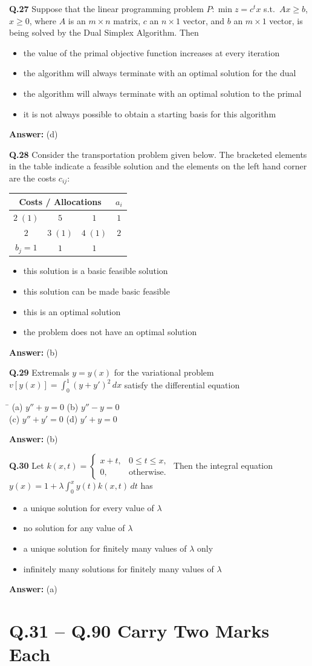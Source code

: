 \documentclass[11pt,a4paper]{article}
\newcommand{\optsfour}[4]{%
  \begin{tabbing}
    \hspace{0.48\linewidth}\=\kill
    (a) #1 \> (b) #2 \\[2pt]
    (c) #3 \> (d) #4
  \end{tabbing}%
}
\newcommand{\optslist}[4]{%
  \begin{itemize}
    \setlength{\itemsep}{2pt}\setlength{\parskip}{0pt}
    \item[(a)] #1
    \item[(b)] #2
    \item[(c)] #3
    \item[(d)] #4
  \end{itemize}%
}
\newcommand{\ans}[1]{\textbf{Answer:} #1\par\medskip}
\begin{document}
\textbf{Q.27} Suppose that the linear programming problem $P : \min z = c^t x$ s.t.\ $Ax \ge b$, $x \ge 0$, where $A$ is an $m \times n$ matrix, $c$ an $n \times 1$ vector, and $b$ an $m \times 1$ vector, is being solved by the Dual Simplex Algorithm. Then
\optslist{the value of the primal objective function increases at every iteration}{the algorithm will always terminate with an optimal solution for the dual}{the algorithm will always terminate with an optimal solution to the primal}{it is not always possible to obtain a starting basis for this algorithm}
\ans{(d)}

\textbf{Q.28} Consider the transportation problem given below. The bracketed elements in the table indicate a feasible solution and the elements on the left hand corner are the costs $c_{ij}$:
\begin{center}
\begin{tabular}{cccc}
  \toprule
  \multicolumn{3}{c}{Costs / Allocations} & $a_i$ \\
  \midrule
  $2\;(1)$ & $5$ & $1$ & $1$ \\
  $2$ & $3\;(1)$ & $4\;(1)$ & $2$ \\
  \midrule
  $b_j = 1$ & $1$ & $1$ & \\
  \bottomrule
\end{tabular}
\end{center}
\optslist{this solution is a basic feasible solution}{this solution can be made basic feasible}{this is an optimal solution}{the problem does not have an optimal solution}
\ans{(b)}

\textbf{Q.29} Extremals $y = y(x)$ for the variational problem $v[y(x)] = \displaystyle\int_0^1 (y + y')^2\,dx$ satisfy the differential equation
\optsfour{$y'' + y = 0$}{$y'' - y = 0$}{$y'' + y' = 0$}{$y' + y = 0$}
\ans{(b)}

\textbf{Q.30} Let $k(x, t) = \begin{cases} x + t, & 0 \le t \le x, \\ 0, & \text{otherwise.} \end{cases}$ Then the integral equation $y(x) = 1 + \lambda \displaystyle\int_0^x y(t) k(x, t)\,dt$ has
\optslist{a unique solution for every value of $\lambda$}{no solution for any value of $\lambda$}{a unique solution for finitely many values of $\lambda$ only}{infinitely many solutions for finitely many values of $\lambda$}
\ans{(a)}

\section*{Q.31 -- Q.90 Carry Two Marks Each}
\end{document}
